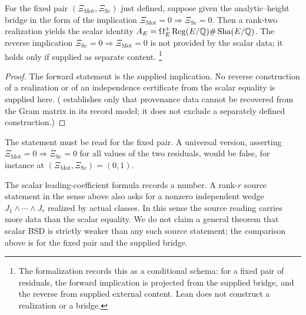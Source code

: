 \begin{theorem}\label{thm:apparatus:vsrc-stage-iii-translation}
For the fixed pair $(\Xi_{\mathrm{Mot}},\Xi_{\mathrm{Sc}})$ just defined,
suppose given the analytic--height bridge in the form of the implication
$\Xi_{\mathrm{Mot}}=0\Rightarrow\Xi_{\mathrm{Sc}}=0$.  Then a rank-two
realization yields the scalar identity
$A_E=\Omega_E^+\operatorname{Reg}(E/\mathbb{Q})\#\operatorname{Sha}(E/\mathbb{Q})$.  The reverse implication
$\Xi_{\mathrm{Sc}}=0\Rightarrow\Xi_{\mathrm{Mot}}=0$ is not provided by
the scalar data; it holds only if supplied as separate content.%
\footnote{The formalization records this as a conditional schema: for a
fixed pair of residuals, the forward implication is projected from the
supplied bridge, and the reverse from supplied external content.  Lean
does not construct a realization or a bridge.}
\end{theorem}

\begin{proof}
The forward statement is the supplied implication.  No reverse construction of a realization or
of an independence certificate from the scalar equality is supplied
here.  ( establishes only that
provenance data cannot be recovered from the Gram matrix in its record
model; it does not exclude a separately defined construction.)
\end{proof}

The statement must be read for the fixed pair.  A universal version,
asserting $\Xi_{\mathrm{Mot}}=0\Rightarrow\Xi_{\mathrm{Sc}}=0$ for all
values of the two residuals, would be false, for instance at
$(\Xi_{\mathrm{Mot}},\Xi_{\mathrm{Sc}})=(0,1)$.

\begin{remark}\label{rmk:apparatus:vsrc-rank-r-stronger}
The scalar leading-coefficient formula records a number.  A rank-$r$
source statement in the sense above also asks for a nonzero independent
wedge $J_1\wedge\cdots\wedge J_r$ realized by actual classes.  In this
sense the source reading carries more data than the scalar equality.  We
do not claim a general theorem that scalar BSD is strictly weaker than any
such source statement; the comparison above is for the fixed pair and the
supplied bridge.
\end{remark}
